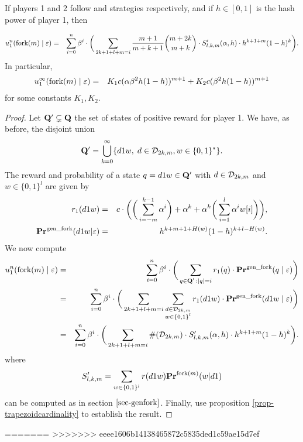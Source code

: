 \begin{myprop*}
If players 1 and 2 follow \mfork and \df strategies respectively, and if $h\in [0,1]$ is the hash power of player 1, then

\begin{eqnarray*}
	u_1^n(\text{\rm fork($m$)} \mid \varepsilon) & = & \sum_{i=0}^{n}\beta^{i} \cdot  \bigg(\sum_{2k+1+l+m=i} \frac{m+1}{m+k+1}{m+2k\choose m+k} \cdot S'_{l,k,m}(\alpha,h)\cdot h^{k+1+m}(1-h)^{k}\bigg).
\end{eqnarray*}
In particular,
\begin{eqnarray*}
	u_1^\infty(\text{\rm fork($m$)} \mid \varepsilon) & = & K_1 c(\alpha\beta^2h(1-h))^{m+1}+K_2 c(\beta^2h(1-h))^{m+1}
\end{eqnarray*}
for some constants $K_1,K_2$.

\end{myprop*}
\begin{proof}
	Let $\mathbf{Q}'\subsetneq \mathbf{Q}$ the set of states of positive reward for player 1. We have, as before, the disjoint union
	$$\mathbf{Q}' = \bigcup_{k=0}^\infty \{d1w,\; d\in\mathcal{D}_{2k,m}, w\in\{0,1\}^\ast\}.$$
	The reward and probability of a state $q=d1w\in \mathbf{Q}'$ with $d\in\mathcal{D}_{2k,m}$ and $w\in\{0,1\}^l$ are given by
\begin{eqnarray*}
	r_1(d1w) &=& c\cdot \bigg(\bigg(\sum_{i=-m}^{k-1}\alpha^i \bigg)+\alpha^{k}+\alpha^{k}\bigg(\sum_{i=1}^{l}\alpha^i w[i]\bigg)\bigg),\\
	\mathbf{Pr}^{\text{\rm gen\_fork}}(d1w|\varepsilon) &=& h^{k+m+1+H(w)}(1-h)^{k+l-H(w)}.
\end{eqnarray*} 
We now compute
\begin{eqnarray*}
	u_1^n(\text{\rm fork($m$)} \mid \varepsilon) & = & \sum_{i=0}^{n}\beta^{i} \cdot  \bigg(\sum_{\substack{q \in \mathbf{Q}' \,: |q| = i}} r_1(q) \cdot 
	\mathbf{Pr}^{\text{\rm gen\_fork}}(q \mid \varepsilon)\bigg)\\
								   & = & \sum_{i=0}^{n}\beta^{i} \cdot  \bigg(\sum_{2k+1+l+m=i}\sum_{\substack{d\in \mathcal{D}_{2k,m}\\w\in\{0,1\}^l}} r_1(d1w) \cdot 
	\mathbf{Pr}^{\text{\rm gen\_fork}}(d1w \mid \varepsilon)\bigg)\\
								   & = & \sum_{i=0}^{n}\beta^{i} \cdot  \bigg(\sum_{2k+1+l+m=i} \#(\mathcal{D}_{2k,m})\cdot S'_{l,k,m}(\alpha,h)\cdot h^{k+1+m}(1-h)^{k}\bigg).
\end{eqnarray*}
where
$$S'_{l,k,m}=\sum_{w\in\{0,1\}^l}r(d1w)\mathbf{Pr}^{\text{\rm fork($m$)}}(w|d1)$$
can be computed as in section $\ref{sec-genfork}$. Finally, use proposition \ref{prop-trapezoidcardinality} to establish the result.
\end{proof}
=======
>>>>>>> eeee1606b14138465872c5835ded1c59ae15d7ef
